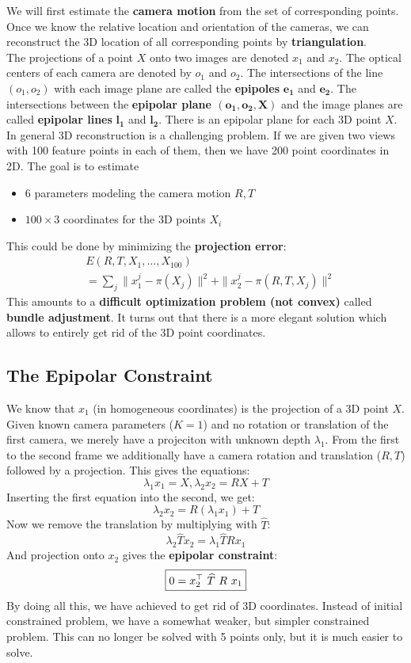 We will first estimate the \textbf{camera motion} from the set of
corresponding points. Once we know the relative location and
orientation of the cameras, we can reconstruct the 3D location
of all corresponding points by \textbf{triangulation}.\\

The projections of a point $X$ onto two images are denoted $x_1$ and $x_2$.
The optical centers of each camera are denoted by $o_1$ and $o_2$.
The intersections of the line $(o_1, o_2)$ with each image plane
are called the \textbf{epipoles} $\bm{e_1}$ and $\bm{e_2}$.
The intersections between the \textbf{epipolar plane $(\bm{o_1, o_2, X})$}
and the image planes are called \textbf{epipolar lines} $\bm{l_1}$ and $\bm{l_2}$.
There is an epipolar plane for each 3D point $X$.\\

In general 3D reconstruction is a challenging problem.
If we are given two views with 100 feature points in each of them,
then we have 200 point coordinates in 2D. The goal is to estimate
\begin{itemize}
	\item 6 parameters modeling the camera motion $R, T$
	\item $100 \times 3$ coordinates for the 3D points $X_i$
\end{itemize}
This could be done by minimizing the \textbf{projection error}:
\begin{align*}
	& E(R,T,X_1, \ldots, X_{100}) \\
	& = \sum_{j} \| x_1^j - \pi(X_j) \|^2 + \| x_2^j - \pi(R,T,X_j) \|^2
\end{align*}
This amounts to a \textbf{difficult optimization problem (not convex)} called
\textbf{bundle adjustment}. It turns out that there is a more elegant
solution which allows to entirely get rid of the 3D point coordinates.\\


\subsection{The Epipolar Constraint}%
\label{sub:the_epipolar_constraint}


We know that $x_1$ (in homogeneous coordinates) is the projection of a 3D point $X$.
Given known camera parameters ($K = 1$) and no rotation or translation
of the first camera, we merely have a projeciton with unknown depth $\lambda_1$.
From the first to the second frame we additionally have a camera
rotation and translation ($R,T$) followed by a projection.
This gives the equations:
\[
	\lambda_1 x_1 = X,
	\lambda_2 x_2 = RX + T
\]
Inserting the first equation into the second, we get:
\[
	\lambda_2 x_2 = R(\lambda_1 x_1) + T
\]
Now we remove the translation by multiplying with $\widehat{T}$:
\[
	\lambda_2 \widehat{T} x_2 = \lambda_1 \widehat{T} R x_1
\]
And projection onto $x_2$ gives the \textbf{epipolar constraint}:
\[
	\boxed{ 0 = x_2^{\top}\ \widehat{T}\ R\ x_1 }
\]
By doing all this, we have achieved to get rid of 3D coordinates.
Instead of initial constrained problem, we have a somewhat weaker,
but simpler constrained problem.
This can no longer be solved with 5 points only,
but it is much easier to solve.\\

